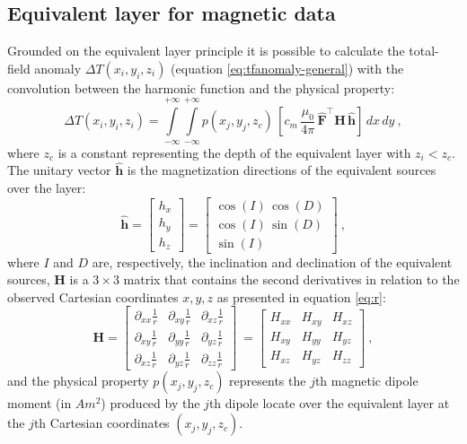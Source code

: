 \subsection*{Equivalent layer for magnetic data}

Grounded on the equivalent layer principle it is possible to calculate the total-field anomaly $\Delta T(x_i, y_i, z_i)$ (equation \ref{eq:tfanomaly-general}) with the convolution between the harmonic function and the physical property:
\begin{equation}
\Delta T(x_{i}, y_{i}, z_{i})
= \int \limits_{-\infty}^{+\infty}
\int \limits_{-\infty}^{+\infty}
p(x_j, y_j, z_{c}) \,
\left[ c_{m} \, \frac{\mu_{0}}{4\pi} \,
\hat{\mathbf{F}}^{\top} \mathbf{H} \, 
\hat{\mathbf{h}} \right] \,
dx \, dy \: ,
\label{eq:tf-p-continuous-mag-positive}
\end{equation}
where $z_c$ is a constant representing the depth of the equivalent layer with $z_i < z_c$. The unitary vector $\hat{\mathbf{h}}$ is the magnetization directions of the equivalent sources over the layer:
\begin{equation}
\hat{\mathbf{h}} = \left[
\begin{array}{c}
{h}_x \\
{h}_y \\
{h}_z
\end{array} \right] = 
 \left[
\begin{array}{c}
\cos(I) \, \cos(D) \\
\cos(I) \, \sin(D) \\
\sin(I)
\end{array}
\right] \: ,
\label{eq:h_hat}
\end{equation}
where $I$ and $D$ are, respectively, the inclination and declination of the equivalent sources, $\mathbf{H}$ is a $3 \times 3$ matrix that contains the second derivatives in relation to the observed Cartesian coordinates $x, y, z$ as presented in equation \ref{eq:r}:
\begin{equation}
\mathbf{H} =
\left[
\begin{array}{ccc}
\partial_{xx} \frac{1}{r} & 
\partial_{xy} \frac{1}{r} & 
\partial_{xz} \frac{1}{r} \\
\partial_{xy} \frac{1}{r} & 
\partial_{yy} \frac{1}{r} & 
\partial_{yz} \frac{1}{r} \\
\partial_{xz} \frac{1}{r} & 
\partial_{yz} \frac{1}{r} & 
\partial_{zz} \frac{1}{r}
\end{array}
\right] \: =
\left[
\begin{array}{ccc}
H_{xx} & 
H_{xy} & 
H_{xz} \\
H_{xy} & 
H_{yy} & 
H_{yz} \\
H_{xz} & 
H_{yz} & 
H_{zz}
\end{array}
\right] \: ,
\label{eq:Hi}
\end{equation}
and the physical property $p(x_j, y_j, z_{c})$ represents the $j$th magnetic dipole moment (in $Am^2$) produced by the $j$th dipole locate over the equivalent layer at the $j$th Cartesian coordinates 
$(x_j, y_j, z_{c})$.

